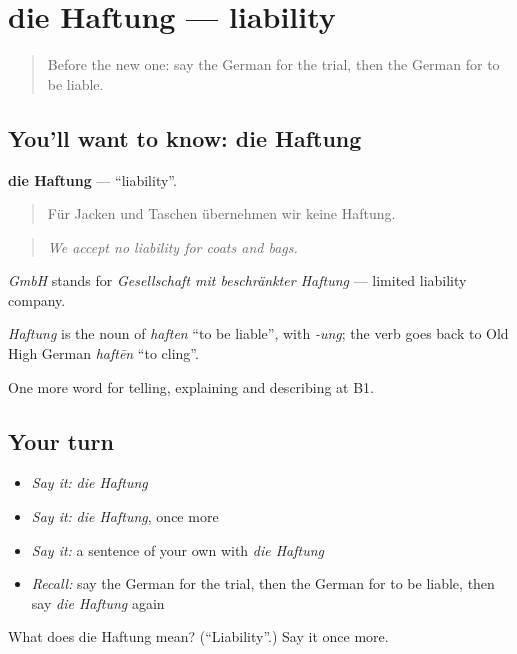 \section[die Haftung]{die Haftung — liability}

\label{lesson:GE-C386-haftung}



\begin{quote}
Before the new one: say the German for the trial, then the German for to be liable.
\end{quote}

\subsection*{You'll want to know: die Haftung}
\textbf{die Haftung} — \textquotedblleft{}liability\textquotedblright{}.

\begin{quote}
Für Jacken und Taschen übernehmen wir keine Haftung.
\end{quote}

\begin{quote}
\emph{We accept no liability for coats and bags.}
\end{quote}

\emph{GmbH} stands for \emph{Gesellschaft mit beschränkter Haftung} — limited liability company.

\begin{cousinweb}
\emph{Haftung} is the noun of \emph{haften} \textquotedblleft{}to be liable\textquotedblright{}, with \emph{-ung}; the verb goes back to Old High German \emph{haftēn} \textquotedblleft{}to cling\textquotedblright{}.
\end{cousinweb}

\begin{grammarlens}[title={What you've built}]
One more word for telling, explaining and describing at B1.
\end{grammarlens}

\subsection*{Your turn}
\begin{itemize}
\raggedright
  \item \emph{Say it:} \emph{die Haftung}
  \item \emph{Say it:} \emph{die Haftung}, once more
  \item \emph{Say it:} a sentence of your own with \emph{die Haftung}
  \item \emph{Recall:} say the German for the trial, then the German for to be liable, then say \emph{die Haftung} again
\end{itemize}

\begin{tcolorbox}[breakable,colback=teal!4,colframe=teal!35!black,title={Before you move on}]
What does die Haftung mean? (\textquotedblleft{}Liability\textquotedblright{}.) Say it once more.
\end{tcolorbox}
